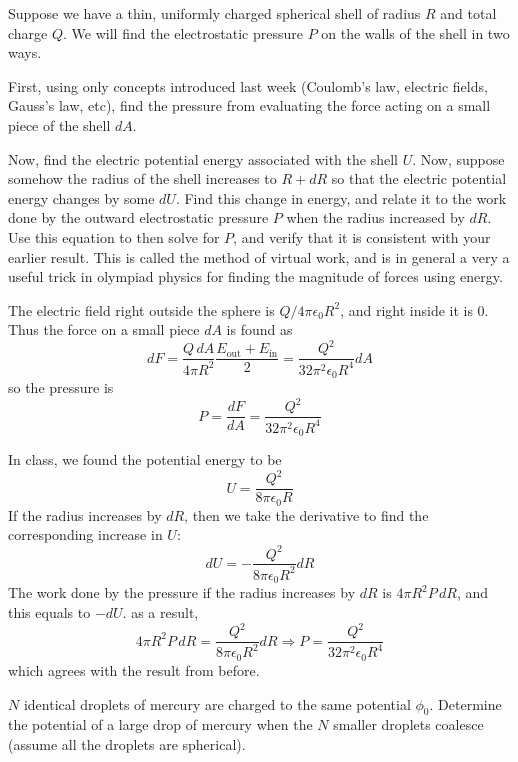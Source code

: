 \documentclass[11pt]{scrartcl}
\begin{document}
\begin{prob}\label{thing}
    Suppose we have a thin, uniformly charged spherical shell of radius $R$ and total charge $Q$. We will find the electrostatic pressure $P$ on the walls of the shell in two ways.\begin{anum}
        \item First, using only concepts introduced last week (Coulomb's law, electric fields, Gauss's law, etc), find the pressure from evaluating the force acting on a small piece of the shell $dA$.
        \item Now, find the electric potential energy associated with the shell $U$. Now, suppose somehow the radius of the shell increases to $R+dR$ so that the electric potential energy changes by some $dU$. Find this change in energy, and relate it to the work done by the outward electrostatic pressure $P$ when the radius increased by $dR$. Use this equation to then solve for $P$, and verify that it is consistent with your earlier result. This is called the method of virtual work, and is in general a very a useful trick in olympiad physics for finding the magnitude of forces using energy.
    \end{anum}
\end{prob}

\begin{sol}
\begin{anum}
    \item The electric field right outside the sphere is $Q/4\pi\epsilon_0R^2$, and right inside it is 0. Thus the force on a small piece $dA$ is found as $$dF=\frac{Q\, dA}{4\pi R^2}\frac{E_{\text{out}}+E_{\text{in}}}{2}=\frac{Q^2}{32\pi^2 \epsilon_0R^4}dA$$so the pressure is $$P=\frac{dF}{dA}=\boxed{\frac{Q^2}{32\pi^2 \epsilon_0R^4}}$$
    \item In class, we found the potential energy to be $$U=\frac{Q^2}{8\pi \epsilon_0R}$$If the radius increases by $dR$, then we take the derivative to find the corresponding increase in $U$:$$dU=-\frac{Q^2}{8\pi \epsilon_0R^2}dR$$The work done by the pressure if the radius increases by $dR$ is $4\pi R^2P\, dR$, and this equals to $-dU$. as a result, $$4\pi R^2P\, dR=\frac{Q^2}{8\pi \epsilon_0R^2}dR\Rightarrow P=\boxed{\frac{Q^2}{32\pi^2\epsilon_0R^4}}$$which agrees with the result from before.
\end{anum}
\end{sol}

\begin{prob}[Kalda]
    $N$ identical droplets of mercury are charged to the same potential $\phi_0$. Determine the potential of a large drop of mercury when the $N$ smaller droplets coalesce (assume all the droplets are spherical).
\end{prob}
\end{document}
